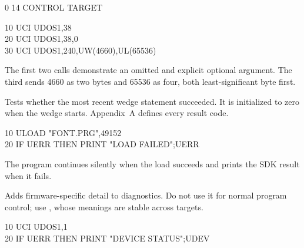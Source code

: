 \begin{referencechapter}
\begin{outputbox}
 0  14 CONTROL TARGET
\end{outputbox}

\begin{screen}
10 UCI UDOS1,38\\
20 UCI UDOS1,38,0\\
30 UCI UDOS1,240,UW(4660),UL(65536)
\end{screen}

\begin{resultbox}
The first two calls demonstrate an omitted and explicit optional argument. The
third sends 4660 as two bytes and 65536 as four, both least-significant byte
first.
\end{resultbox}




Tests whether the most recent wedge statement succeeded. It is initialized to
zero when the wedge starts. Appendix~A defines every result code.

\begin{screen}
10 ULOAD "FONT.PRG",49152\\
20 IF UERR THEN PRINT "LOAD FAILED";UERR
\end{screen}

\begin{resultbox}
The program continues silently when the load succeeds and prints the SDK result
when it fails.
\end{resultbox}




Adds firmware-specific detail to diagnostics. Do not use it for normal program
control; use , whose meanings are stable across targets.

\begin{screen}
10 UCI UDOS1,1\\
20 IF UERR THEN PRINT "DEVICE STATUS";UDEV
\end{screen}


\end{referencechapter}
